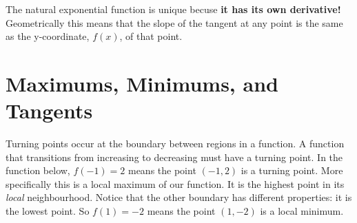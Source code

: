 The natural exponential function is unique becuse \textbf{it has its own derivative!} Geometrically this means that the slope of the tangent at any point is the same as the y-coordinate, $f(x)$, of that point. 

\section{Maximums, Minimums, and Tangents}
Turning points occur at the boundary between regions in a function.  A function that transitions from increasing to decreasing must have a turning point. In the function below, $f(-1)=2$ means the point $(-1,2)$ is a turning point. More specifically this is a local maximum of our function. It is the highest point in its \emph{local} neighbourhood. Notice that the other boundary has different properties: it is the lowest point. So $f(1)=-2$ means the point $(1,-2)$ is a local minimum.


